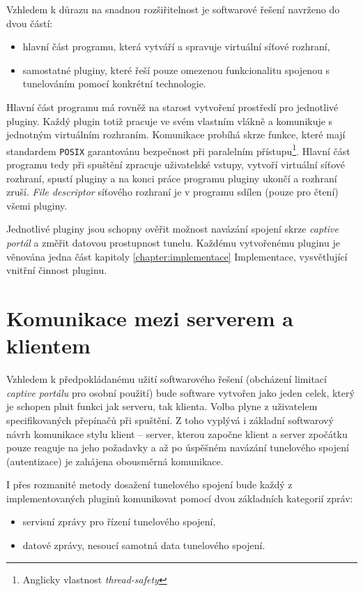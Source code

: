 \documentclass[thesis=M,czech]{FITthesis}[2012/10/20]
\begin{document}
Vzhledem k důrazu na snadnou rozšiřitelnost je softwarové řešení navrženo do dvou částí:

\begin{itemize}
 \item hlavní část programu, která vytváří a spravuje virtuální síťové rozhraní,
 \item samostatné pluginy, které řeší pouze omezenou funkcionalitu spojenou s tunelováním pomocí konkrétní technologie.
\end{itemize}

Hlavní část programu má rovněž na starost vytvoření prostředí pro jednotlivé pluginy. Každý plugin totiž pracuje ve svém vlastním vlákně a komunikuje s jednotným virtuálním rozhraním. Komunikace probíhá skrze funkce, které mají standardem \texttt{POSIX} garantovánu bezpečnost při paralelním přístupu\footnote{Anglicky vlastnost \textit{thread-safety}}. Hlavní část programu tedy při spuštění zpracuje uživatelské vstupy, vytvoří virtuální síťové rozhraní, spustí pluginy a na konci práce programu pluginy ukončí a rozhraní zruší. \textit{File descriptor} síťového rozhraní je v programu sdílen (pouze pro čtení) všemi pluginy.

Jednotlivé pluginy jsou schopny ověřit možnost navázání spojení skrze \textit{captive portál} a změřit datovou prostupnost tunelu. Každému vytvořenému pluginu je věnována jedna část kapitoly \ref{chapter:implementace} Implementace, vysvětlující vnitřní činnost pluginu.

\section{Komunikace mezi serverem a klientem}

Vzhledem k předpokládanému užití softwarového řešení (obcházení limitací \textit{captive portálu} pro osobní použití) bude software vytvořen jako jeden celek, který je schopen plnit funkci jak serveru, tak klienta. Volba plyne z uživatelem specifikovaných přepínačů při spuštění. Z toho vyplývá i základní softwarový návrh komunikace stylu klient -- server, kterou započne klient a server zpočátku pouze reaguje na jeho požadavky a až po úspěšném navázání tunelového spojení (autentizace) je zahájena obousměrná komunikace.

I přes rozmanité metody dosažení tunelového spojení bude každý z implementovaných pluginů komunikovat pomocí dvou základních kategorií zpráv:
\begin{itemize}
 \item servisní zprávy pro řízení tunelového spojení,
 \item datové zprávy, nesoucí samotná data tunelového spojení.
\end{itemize}
 
\end{document}
